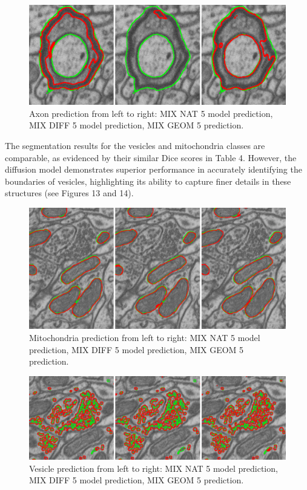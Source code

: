 \documentclass[journal,article,submit,pdftex,moreauthors]{Definitions/mdpi}
\begin{document}
\begin{figure}[H]
	\includegraphics[width=13.5 cm]{Definitions/figure-12.png}
	\caption{Axon prediction from left to right: MIX NAT 5 model prediction, MIX DIFF 5 model prediction, MIX GEOM 5 prediction.\label{fig12}}
\end{figure}

The segmentation results for the vesicles and mitochondria classes are comparable, as evidenced by their similar Dice scores in Table 4. However, the diffusion model demonstrates superior performance in accurately identifying the boundaries of vesicles, highlighting its ability to capture finer details in these structures (see Figures 13 and 14).

\begin{figure}[H]
	\includegraphics[width=13.5 cm]{Definitions/figure-13.png}
	\caption{Mitochondria prediction from left to right: MIX NAT 5 model prediction, MIX DIFF 5 model prediction, MIX GEOM 5 prediction.\label{fig13}}
\end{figure}

\begin{figure}[H]
	\includegraphics[width=13.5 cm]{Definitions/figure-14.png}
	\caption{Vesicle prediction from left to right: MIX NAT 5 model prediction, MIX DIFF 5 model prediction, MIX GEOM 5 prediction.\label{fig14}}
\end{figure}
\end{document}
